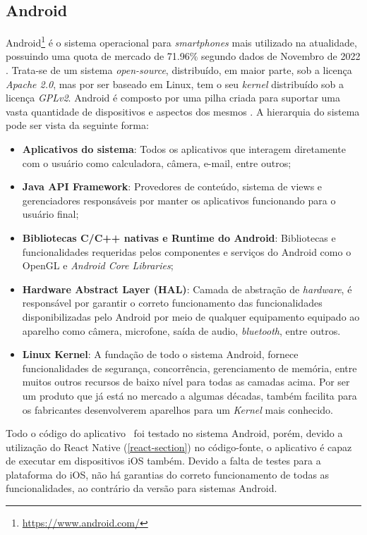 \subsection{Android}

Android\footnote{\url{https://www.android.com/}} é o sistema operacional para \textit{smartphones} mais utilizado na atualidade, possuindo uma quota de mercado de 71.96\% segundo dados de Novembro de 2022 \cite{mobile-os}. Trata-se de um sistema \textit{open-source}, distribuído, em maior parte, sob a licença \textit{Apache 2.0}, mas por ser baseado em Linux, tem o seu \textit{kernel} distribuído sob a licença \textit{GPLv2}. Android é composto por uma pilha criada para suportar uma vasta quantidade de dispositivos e aspectos dos mesmos \cite{android}. A hierarquia do sistema pode ser vista da seguinte forma:

\begin{itemize}
    \item \textbf{Aplicativos do sistema}: Todos os aplicativos que interagem diretamente com o usuário como calculadora, câmera, e-mail, entre outros;
    \item \textbf{Java API Framework}: Provedores de conteúdo, sistema de views e gerenciadores responsáveis por manter os aplicativos funcionando para o usuário final;
    \item \textbf{Bibliotecas C/C++ nativas e Runtime do Android}: Bibliotecas e funcionalidades requeridas pelos componentes e serviços do Android como o OpenGL e \textit{Android Core Libraries};
    \item \textbf{Hardware Abstract Layer (HAL)}: Camada de abstração de \textit{hardware}, é responsável por garantir o correto funcionamento das funcionalidades disponibilizadas pelo Android por meio de qualquer equipamento equipado ao aparelho como câmera, microfone, saída de audio, \textit{bluetooth}, entre outros.
    \item \textbf{Linux Kernel}: A fundação de todo o sistema Android, fornece funcionalidades de segurança, concorrência, gerenciamento de memória, entre muitos outros recursos de baixo nível para todas as camadas acima. Por ser um produto que já está no mercado a algumas décadas, também facilita para os fabricantes desenvolverem aparelhos para um \textit{Kernel} mais conhecido.
\end{itemize}

Todo o código do aplicativo \appName\ foi testado no sistema Android, porém, devido a utilização do React Native (\ref{react-section}) no código-fonte, o aplicativo é capaz de executar em dispositivos iOS também. Devido a falta de testes para a plataforma do iOS, não há garantias do correto funcionamento de todas as funcionalidades, ao contrário da versão para sistemas Android.

